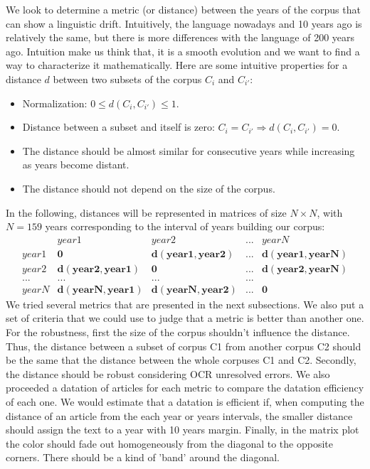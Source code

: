 
We look to determine a metric (or distance) between the years of the corpus that can show a linguistic drift. Intuitively, the language nowadays and 10 years ago is relatively the same, but there is more differences with the language of 200 years ago. Intuition make us think that, it is a smooth evolution and we want to find a way to characterize it mathematically. Here are some intuitive properties for a distance $d$ between two subsets of the corpus $C_i$ and $C_{i'}$:

\begin{itemize}
 \item Normalization: $0 \leq d(C_i,C_{i'}) \leq 1$.
 \item Distance between a subset and itself is zero: $C_i = C_{i'} \Rightarrow d(C_i,C_{i'}) = 0$.
 \item The distance should be almost similar for consecutive years while increasing as years become distant.
 \item The distance should not depend on the size of the corpus.
\end{itemize}

In the following, distances will be represented in matrices of size $N \times N$, with $N = 159$ years corresponding to the interval of years building our corpus:
\[
\begin{matrix}
 & year1 & year2 & ... & yearN \\
 year1 & \mathbf{0} & \mathbf{d(year1,year2)} & ... & \mathbf{d(year1,yearN)} \\
 year2 & \mathbf{d(year2,year1)} & \mathbf{0} & ... & \mathbf{d(year2,yearN)} \\
 ... & ... & ... & ... \\
 yearN & \mathbf{d(yearN,year1)} & \mathbf{d(yearN,year2)} & ... & \mathbf{0}
\end{matrix}
\]
We tried several metrics that are presented in the next subsections. We also put a set of criteria that we could use to judge that a metric is better than another one.
For the robustness, first the size of the corpus shouldn't influence the distance. Thus, the distance between a subset of corpus C1 from another corpus C2 should be the same that the distance between the whole corpuses C1 and C2.
Secondly, the distance should be robust considering OCR unresolved errors.
We also proceeded a datation of articles for each metric to compare the datation efficiency of each one. We would estimate that a datation is efficient if, when computing the distance of an article from the each year or years intervals, the smaller distance should assign the text to a year with 10 years margin.
Finally, in the matrix plot the color should fade out homogeneously from the diagonal to the opposite corners. There should be a kind of 'band' around the diagonal.
